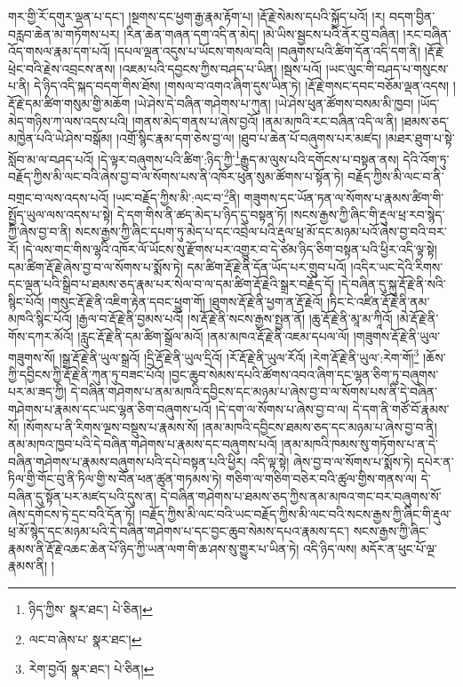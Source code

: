 གར་གྱི་རོ་དགུར་ལྡན་པ་དང་། །སྔགས་དང་ཕྱག་རྒྱ་རྣམ་རྟོག་པ། །རྡོ་རྗེ་སེམས་དཔའི་སྐྱོད་པའོ། །ར། བདག་བྱིན་བརླབ་ཆེན་མ་གཏོགས་པར། །རིན་ཆེན་གཞན་དག་འདི་ན་མེད། །མེ་ཡིས་སྦྱངས་པའི་ནོར་བུ་བཞིན། །རང་བཞིན་འོད་གསལ་རྣམ་དག་པའོ། །དཔལ་ལྡན་འདུས་པ་ཡོངས་གསལ་བའི། །བཞུགས་པའི་ཚིག་དོན་འདི་དག་ནི། །རྡོ་རྗེ་ཕྲེང་བའི་རྗེས་འབྲངས་ནས། །འཇམ་པའི་དབྱངས་ཀྱིས་བཤད་པ་ཡིན། །སྦས་པའོ། །ཡང་ལུང་གི་བཤད་པ་གསུངས་པ་ནི། དེ་ཉིད་འདི་སྐད་བདག་གིས་ཐོས། །གསལ་བ་འགའ་ཞིག་དུས་ཡིན་ཏེ། །རྡོ་རྗེ་གསང་དབང་བཅོམ་ལྡན་འདས། །རྡོ་རྗེ་དམ་ཚིག་གསུམ་གྱི་མཆོག །ཡེ་ཤེས་དེ་བཞིན་གཤེགས་པ་ཀུན། །ཡེ་ཤེས་ཕུན་ཚོགས་བསམ་མི་ཁྱབ། །ཡོད་མེད་གཉིས་ཀ་ལས་འདས་པའི། །གནས་མེད་གནས་པ་ཞེས་བྱའོ། །ནམ་མཁའི་རང་བཞིན་འདི་ལ་ནི། །ཐམས་ཅད་མཁྱེན་པའི་ཡེ་ཤེས་བསྒོམ། །འགྲོ་སྙིང་རྣམ་དག་ཅེས་བྱ་ལ། །ཐུབ་པ་ཆེན་པོ་བཞུགས་པར་མཛད། །མཐར་ཐུག་པ་སྟེ་སློབ་མ་ལ་བཤད་པའོ། །དེ་ལྟར་བཞུགས་པའི་ཚིག་:ཉིད་ཀྱི་\footnote{ཉིད་ཀྱིས་  སྣར་ཐང་།  པེ་ཅིན། }རྒྱུད་མ་ལུས་པའི་དགོངས་པ་བསྟན་ནས། དེའི་འོག་ཏུ་བརྗོད་ཀྱིས་མི་ལང་བའི་ཞེས་བྱ་བ་ལ་སོགས་པས་ནི་འཁོར་ཕུན་སུམ་ཚོགས་པ་སྟོན་ཏེ། བརྗོད་ཀྱིས་མི་ལང་བ་ནི་བགྲང་བ་ལས་འདས་པའོ། །ཡང་བརྗོད་ཀྱིས་མི་:ལང་བ་\footnote{ལང་བ་ཞེས་པ་  སྣར་ཐང་། }ནི། གཟུགས་དང་ཡོན་ཏན་ལ་སོགས་པ་རྣམས་ཚིག་གི་སྤྱོད་ཡུལ་ལས་འདས་པ་སྟེ། དེ་དག་གིས་ནི་ཚད་མེད་པ་ཉིད་དུ་བསྟན་ཏོ། །སངས་རྒྱས་ཀྱི་ཞིང་གི་རྡུལ་ཕྲ་རབ་སྙེད་ཀྱི་ཞེས་བྱ་བ་ནི། སངས་རྒྱས་ཀྱི་ཞིང་དཔག་ཏུ་མེད་པ་དང་འབྲེལ་པའི་རྡུལ་ཕྲ་མོ་དང་མཉམ་པའོ་ཞེས་བྱ་བའི་བར་རོ། །དེ་ལས་གང་གིས་ལྷའི་འཁོར་ལོ་ཡོངས་སུ་རྫོགས་པར་འགྱུར་བ་དེ་ཙམ་ཉིད་ཅིག་བསྟན་པའི་ཕྱིར་འདི་ལྟ་སྟེ། དམ་ཚིག་རྡོ་རྗེ་ཞེས་བྱ་བ་ལ་སོགས་པ་སྨོས་ཏེ། དམ་ཚིག་རྡོ་རྗེ་ནི་དོན་ཡོད་པར་གྲུབ་པའོ། །འདིར་ཡང་དེའི་རིགས་དང་ལྡན་པའི་སྒྲིབ་པ་ཐམས་ཅད་རྣམ་པར་སེལ་བ་ལ་དམ་ཚིག་རྡོ་རྗེའི་སྒྲར་བརྗོད་དོ། །དེ་བཞིན་དུ་སྐུ་རྡོ་རྗེ་ནི་སའི་སྙིང་པོའོ། །གསུང་རྡོ་རྗེ་ནི་འཇིག་རྟེན་དབང་ཕྱུག་གོ། །ཐུགས་རྡོ་རྗེ་ནི་ཕྱག་ན་རྡོ་རྗེའོ། །ཏིང་ངེ་འཛིན་རྡོ་རྗེ་ནི་ནམ་མཁའི་སྙིང་པོའོ། །རྒྱལ་བ་རྡོ་རྗེ་ནི་བྱམས་པའོ། །ས་རྡོ་རྗེ་ནི་སངས་རྒྱས་སྤྱན་ནོ། །ཆུ་རྡོ་རྗེ་ནི་མཱ་མ་ཀཱིའོ། །མེ་རྡོ་རྗེ་ནི་གོས་དཀར་མོའོ། །རླུང་རྡོ་རྗེ་ནི་དམ་ཚིག་སྒྲོལ་མའོ། །ནམ་མཁའ་རྡོ་རྗེ་ནི་འཇམ་དཔལ་ལོ། །གཟུགས་རྡོ་རྗེ་ནི་ཡུལ་གཟུགས་སོ། །སྒྲ་རྡོ་རྗེ་ནི་ཡུལ་སྒྲའོ། །དྲི་རྡོ་རྗེ་ནི་ཡུལ་དྲིའོ། །རོ་རྡོ་རྗེ་ནི་ཡུལ་རོའོ། །རེག་རྡོ་རྗེ་ནི་ཡུལ་:རེག་གོ།\footnote{རེག་བྱའོ།  སྣར་ཐང་།  པེ་ཅིན། } །ཆོས་ཀྱི་དབྱིངས་ཀྱི་རྡོ་རྗེ་ནི་ཀུན་ཏུ་བཟང་པོའོ། །བྱང་ཆུབ་སེམས་དཔའི་ཚོགས་འབའ་ཞིག་དང་ལྷན་ཅིག་ཏུ་བཞུགས་པར་མ་ཟད་ཀྱི། དེ་བཞིན་གཤེགས་པ་ནམ་མཁའི་དབྱིངས་དང་མཉམ་པ་ཞེས་བྱ་བ་ལ་སོགས་པས་ནི་དེ་བཞིན་གཤེགས་པ་རྣམས་དང་ཡང་ལྷན་ཅིག་བཞུགས་པའོ། །དེ་དག་ལ་སོགས་པ་ཞེས་བྱ་བ་ལ། དེ་དག་ནི་གཙོ་བོ་རྣམས་སོ། །སོགས་པ་ནི་རིགས་ལྔས་བསྡུས་པ་རྣམས་སོ། །ནམ་མཁའི་དབྱིངས་ཐམས་ཅད་དང་མཉམ་པ་ཞེས་བྱ་བ་ནི། ནམ་མཁའ་ཁྱབ་པའི་དེ་བཞིན་གཤེགས་པ་རྣམས་དང་བཞུགས་པའོ། །ནམ་མཁའི་ཁམས་སུ་གཏོགས་པ་ན་དེ་བཞིན་གཤེགས་པ་རྣམས་བཞུགས་པའི་དཔེ་བསྟན་པའི་ཕྱིར། འདི་ལྟ་སྟེ། ཞེས་བྱ་བ་ལ་སོགས་པ་སྨོས་ཏེ། དཔེར་ན་ཏིལ་གྱི་གོང་བུ་ནི་ཏིལ་གྱི་ས་བོན་ཕན་ཚུན་གཏམས་ཏེ། གཅིག་ལ་གཅིག་བཅེར་བའི་ཚུལ་གྱིས་གནས་ལ། དེ་བཞིན་དུ་སྟོན་པར་མཛད་པའི་དུས་ན། དེ་བཞིན་གཤེགས་པ་ཐམས་ཅད་ཀྱིས་ནམ་མཁའ་གང་བར་བཞུགས་སོ་ཞེས་དགོངས་ཏེ་དྲང་བའི་དོན་ཏོ། །བརྗོད་ཀྱིས་མི་ལང་བའི་ཡང་བརྗོད་ཀྱིས་མི་ལང་བའི་སངས་རྒྱས་ཀྱི་ཞིང་གི་རྡུལ་ཕྲ་མོ་སྙེད་དང་མཉམ་པའི་དེ་བཞིན་གཤེགས་པ་དང་བྱང་ཆུབ་སེམས་དཔའ་རྣམས་དང་། སངས་རྒྱས་ཀྱི་ཞིང་རྣམས་ནི་རྡོ་རྗེ་འཆང་ཆེན་པོ་ཉིད་ཀྱི་ཡན་ལག་གི་ཆ་ཤས་སུ་གྱུར་པ་ཡིན་ཏེ། འདི་ཉིད་ལས། མདོར་ན་ཕུང་པོ་ལྔ་རྣམས་ནི། །
